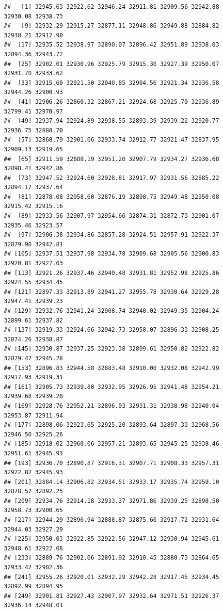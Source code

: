 \documentclass[
]{article}
\begin{document}
\begin{verbatim}
##   [1] 32945.63 32922.62 32946.24 32911.81 32909.56 32942.88 32930.08 32938.73
##   [9] 32932.29 32915.27 32877.11 32948.86 32949.88 32884.82 32938.21 32912.90
##  [17] 32935.52 32938.97 32890.07 32896.42 32951.89 32938.03 32894.36 32943.72
##  [25] 32902.01 32930.96 32925.79 32915.30 32927.39 32950.07 32931.70 32933.62
##  [33] 32915.60 32921.50 32940.85 32904.56 32921.34 32936.58 32944.26 32900.93
##  [41] 32906.26 32860.32 32867.21 32924.68 32925.70 32936.89 32799.41 32970.97
##  [49] 32937.94 32924.89 32938.55 32893.39 32939.22 32920.77 32936.75 32888.70
##  [57] 32868.79 32901.66 32933.74 32912.77 32921.47 32837.95 32909.13 32919.65
##  [65] 32911.59 32888.19 32951.20 32907.79 32934.27 32936.68 32898.41 32942.86
##  [73] 32947.52 32924.60 32928.81 32917.97 32931.56 32885.22 32894.12 32937.64
##  [81] 32878.08 32958.60 32876.19 32898.75 32949.48 32950.08 32915.42 32915.16
##  [89] 32933.56 32907.97 32954.66 32874.31 32872.73 32901.07 32935.46 32923.57
##  [97] 32906.38 32934.86 32857.28 32924.51 32957.91 32922.37 32879.90 32942.81
## [105] 32937.51 32937.98 32934.78 32909.68 32905.56 32900.83 32920.81 32927.03
## [113] 32921.26 32937.46 32940.48 32931.81 32952.98 32925.86 32924.55 32934.45
## [121] 32897.33 32913.89 32941.27 32955.78 32930.64 32929.28 32947.41 32939.23
## [129] 32932.76 32941.24 32908.74 32940.02 32949.35 32904.24 32899.61 32937.82
## [137] 32919.33 32924.66 32942.73 32958.07 32896.33 32908.25 32874.26 32938.87
## [145] 32930.87 32937.25 32923.38 32899.61 32950.82 32922.82 32879.47 32945.28
## [153] 32896.83 32944.58 32883.48 32910.08 32932.08 32942.99 32917.93 32919.31
## [161] 32905.73 32939.80 32932.95 32926.95 32941.48 32954.21 32939.68 32939.20
## [169] 32928.76 32952.21 32896.03 32931.31 32938.98 32940.04 32953.87 32911.94
## [177] 32898.06 32923.65 32925.20 32893.64 32897.33 32968.56 32946.50 32925.26
## [185] 32918.02 32960.06 32957.21 32893.65 32945.25 32938.46 32951.61 32945.93
## [193] 32936.70 32890.87 32916.31 32907.71 32908.33 32957.31 32922.82 32945.93
## [201] 32884.14 32906.82 32934.51 32933.17 32935.74 32959.10 32878.52 32892.25
## [209] 32934.76 32914.18 32933.37 32971.86 32939.25 32898.50 32958.73 32900.65
## [217] 32944.29 32896.94 32888.87 32875.60 32917.72 32931.64 32944.03 32927.29
## [225] 32950.03 32922.85 32922.56 32947.12 32930.94 32945.61 32948.61 32922.08
## [233] 32889.76 32902.06 32891.92 32910.45 32880.73 32864.65 32933.42 32902.36
## [241] 32955.26 32920.01 32932.29 32942.28 32917.45 32934.45 32892.99 32894.95
## [249] 32901.81 32927.43 32907.97 32932.64 32971.51 32926.37 32936.14 32948.01

\end{verbatim}
\end{document}
